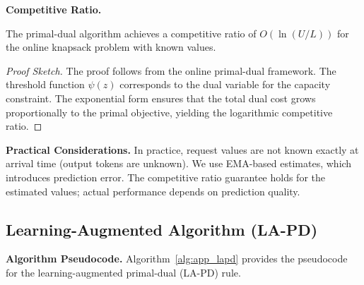 \textbf{Competitive Ratio.}
\begin{samepage}
\begin{theorem}
The primal-dual algorithm achieves a competitive ratio of $O(\ln(U/L))$ for the online knapsack problem with known values.
\end{theorem}
\begin{proof}[Proof Sketch]
The proof follows from the online primal-dual framework. The threshold function $\psi(z)$ corresponds to the dual variable for the capacity constraint. The exponential form ensures that the total dual cost grows proportionally to the primal objective, yielding the logarithmic competitive ratio.
\end{proof}
\end{samepage}

\textbf{Practical Considerations.}
In practice, request values are not known exactly at arrival time (output tokens are unknown). We use EMA-based estimates, which introduces prediction error. The competitive ratio guarantee holds for the estimated values; actual performance depends on prediction quality.

\subsection{Learning-Augmented Algorithm (LA-PD)}
\label{app:lapd}

\noindent\textbf{Algorithm Pseudocode.} Algorithm~\ref{alg:app_lapd} provides the pseudocode for the learning-augmented primal-dual (LA-PD) rule.

